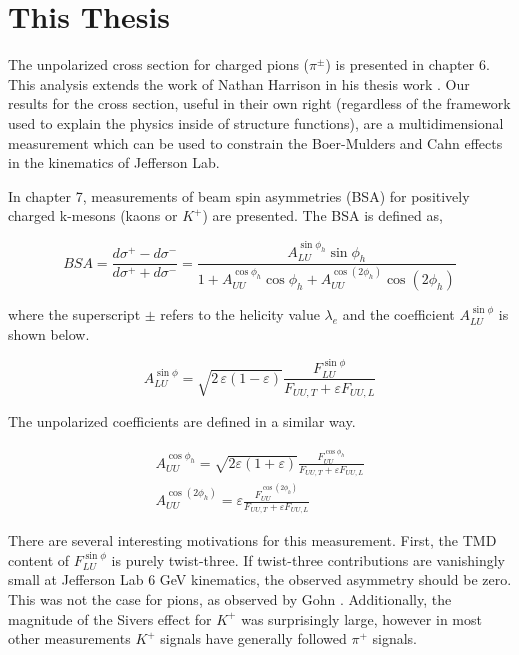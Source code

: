 \section{This Thesis}
The unpolarized cross section for charged pions ($\pi^{\pm}$) is presented in chapter 6.  This analysis extends the work of Nathan Harrison in his thesis work \cite{theses-harrison:2015}.  Our results for the cross section, useful in their own right (regardless of the framework used to explain the physics inside of structure functions), are a multidimensional measurement which can be used to constrain the Boer-Mulders and Cahn effects in the kinematics of Jefferson Lab.  

In chapter 7, measurements of beam spin asymmetries (BSA) for positively charged k-mesons (kaons or $K^+$) are presented.  The BSA is defined as, 

\begin{equation}
	BSA = \frac{d\sigma^+ - d\sigma^-}{d\sigma^+ + d\sigma^-} = \frac{A_{LU}^{\sin\phi_h} \sin\phi_h}{1 + A_{UU}^{\cos\phi_h} \cos\phi_h + A_{UU}^{\cos(2\phi_h)} \cos(2\phi_h)}
\end{equation}

where the superscript $\pm$ refers to the helicity value $\lambda_e$ and the coefficient $A_{LU}^{\sin\phi}$ is shown below.

\begin{equation}
  A_{LU}^{\sin\phi} = \sqrt{2\,\varepsilon (1-\varepsilon)} \frac{F_{LU}^{\sin\phi}}{F_{UU,T} + \varepsilon F_{UU,L}}
\end{equation}

The unpolarized coefficients are defined in a similar way.

\begin{gather}
	A_{UU}^{\cos\phi_h} = \sqrt{2\varepsilon(1+\varepsilon)} \frac{F_{UU}^{\cos\phi_h}}{F_{UU,T} + \varepsilon F_{UU,L}} \\
	A_{UU}^{\cos(2\phi_h)} = \varepsilon \frac{F_{UU}^{\cos(2\phi_h)}}{F_{UU,T} + \varepsilon F_{UU,L}}
	\label{eqn:a-coefficients}
\end{gather}

There are several interesting motivations for this measurement.  First, the TMD content of $F_{LU}^{\sin\phi}$ is purely twist-three.  If twist-three contributions are vanishingly small at Jefferson Lab 6 GeV kinematics, the observed asymmetry should be zero.  This was not the case for pions, as observed by Gohn \cite{theses-gohn:2012}.  Additionally, the magnitude of the Sivers effect for $K^+$ was surprisingly large, however in most other measurements $K^+$ signals have generally followed $\pi^+$ signals.  \\  

